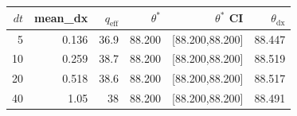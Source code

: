 \begin{tabular}{r r r r r r}
\hline
$dt$ & mean\_dx & $q_{\mathrm{eff}}$ & $\theta^*$ & $\theta^*$ CI & $\theta_{\mathrm{dx}}$ \\
\hline
5 & 0.136 & 36.9 & 88.200 & [88.200,88.200] & 88.447 \\
10 & 0.259 & 38.7 & 88.200 & [88.200,88.200] & 88.519 \\
20 & 0.518 & 38.6 & 88.200 & [88.200,88.200] & 88.517 \\
40 & 1.05 & 38 & 88.200 & [88.200,88.200] & 88.491 \\
\hline
\end{tabular}
